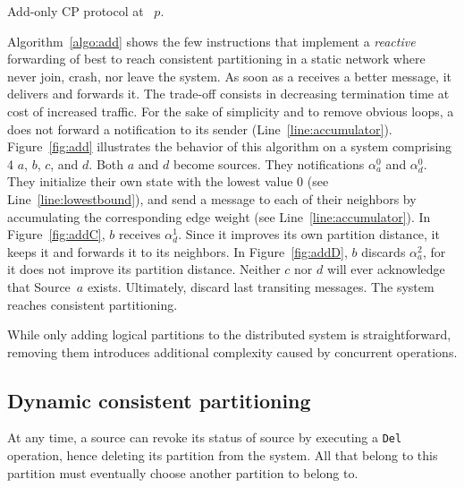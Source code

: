 \begin{algorithm}
  
  \caption{\label{algo:add}Add-only CP protocol at \Process~$p$.}
\end{algorithm}

Algorithm~\ref{algo:add} shows the few instructions that implement a
\emph{reactive} forwarding of best to reach consistent partitioning in
a static network where \processes never join, crash, nor leave the
system. As soon as a \process receives a better message, it delivers
and forwards it. The trade-off consists in decreasing termination time
at cost of increased traffic. For the sake of simplicity and to remove
obvious loops, a \process does not forward a notification to its
sender (Line~\ref{line:accumulator}). Figure~\ref{fig:add} illustrates
the behavior of this algorithm on a system comprising 4 \processes
$a$, $b$, $c$, and $d$. Both $a$ and $d$ become sources.  They \NAMEB
notifications $\alpha_a^0$ and $\alpha_d^0$. They initialize their own
state with the lowest value $0$ (see Line~\ref{line:lowestbound}), and
send a message to each of their neighbors by accumulating the
corresponding edge weight (see Line~\ref{line:accumulator}). In
Figure~\ref{fig:addC}, $b$ receives $\alpha_{d}^{1}$. Since it
improves its own partition distance, it keeps it and forwards it to
its neighbors. In Figure~\ref{fig:addD}, $b$ discards
$\alpha_{a}^{2}$, for it does not improve its partition
distance. Neither $c$ nor $d$ will ever acknowledge that Source~$a$
exists. Ultimately, \processes discard last transiting
messages.
The system reaches consistent partitioning.

While only adding logical partitions to the distributed system is
straightforward, removing them introduces additional complexity caused
by concurrent operations.

\subsection{Dynamic consistent partitioning}
\label{subsec:dynamic}

At any time, a source can revoke its status of source by executing a
\texttt{Del} operation, hence deleting its partition from the
system. All \processes that belong to this partition must eventually
choose another partition to belong to.




